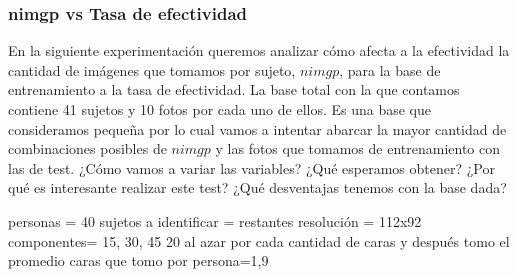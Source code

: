\subsubsection{nimgp vs Tasa de efectividad}
En la siguiente experimentación queremos analizar cómo afecta a la efectividad la cantidad de imágenes que tomamos por sujeto, $nimgp$, para la base
de entrenamiento a la tasa de efectividad. La base total con la que contamos contiene 41 sujetos y 10 fotos por cada uno de ellos. Es una base que
consideramos pequeña por lo cual vamos a intentar abarcar la mayor cantidad de combinaciones posibles de $nimgp$ y las fotos que tomamos de
entrenamiento con las de test.
¿Cómo vamos a variar las variables?
¿Qué esperamos obtener?
¿Por qué es interesante realizar este test?
¿Qué desventajas tenemos con la base dada?

personas = 40
sujetos a identificar = restantes
resolución = 112x92
componentes= 15, 30, 45
20 al azar por cada cantidad de caras y después tomo el promedio
caras que tomo por persona=1,9